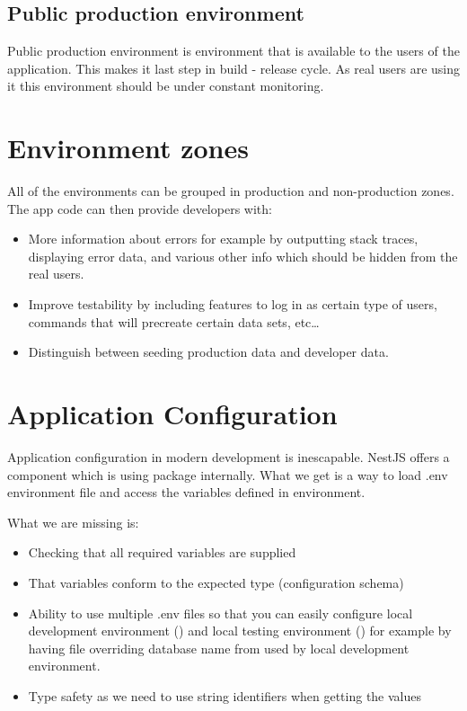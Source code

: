     \subsection{Public production environment}\label{subsec:public-production-environment}
    Public production environment  is environment that is available to the
    users of the application.
    This makes it last step in build - release cycle.
    As real users are using it this environment should be under constant monitoring.


    \section{Environment zones}\label{sec:environment-zones}
    All of the environments can be grouped in production and non-production zones.
    The app code can then provide developers with:
    \begin{itemize}
        \item More information about errors for example by outputting
        stack traces, displaying error data, and various other info which should be
        hidden from the real users.
        \item Improve testability by including features to log in as certain type
        of users, commands that will precreate certain data sets, etc\dots
        \item Distinguish between seeding production data and developer data.
    \end{itemize}


    \section{Application Configuration}\label{sec:application-configuration}

    Application configuration in modern development is inescapable.
    NestJS
    offers a component  which is using  package internally.
    What we get is a way to load .env environment file and access the variables
    defined in environment.

    What we are missing is:
    \begin{itemize}
        \item Checking that all required variables are supplied
        \item That variables conform to the expected type (configuration schema)
        \item Ability to use multiple .env files so that you can easily configure
        local development environment () and local testing environment ()
        for example by having  file overriding database name from 
        used by local development environment.
        \item Type safety as we need to use string identifiers when getting the
        values
    \end{itemize}

